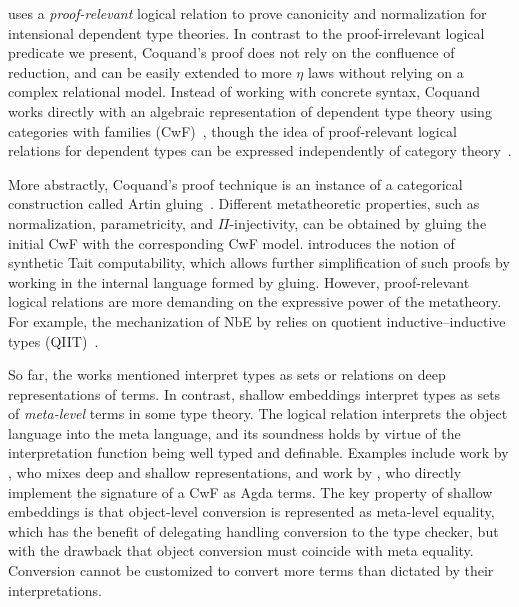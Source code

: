 \documentclass[\ifpublic nolinenum\else\fi,online,OA]{jfp}
\newcommand{\jc}[1]{}
\theoremstyle{definition}
\begin{document}
\citet{coquand:canonicity,coquand:prop} uses a \emph{proof-relevant} logical
relation to prove canonicity and normalization for intensional
dependent type theories. In contrast to the proof-irrelevant logical predicate
we present, Coquand's proof does not rely on the confluence of reduction,
and can be easily extended to more $\eta$ laws without relying on a
complex relational model. Instead of working with concrete syntax,
Coquand works directly with an algebraic representation of dependent
type theory using categories with families (CwF)~\citep{hofmann:cwf},
though the idea of proof-relevant logical relations for dependent
types can be expressed independently of category
theory~\citep{barras2012semantical}.

More abstractly, Coquand's proof technique is an instance of a categorical
construction called Artin gluing~\citep{kaposi:gluing}. Different
metatheoretic properties, such as normalization, parametricity, and
$\Pi$-injectivity, can be obtained by gluing the initial CwF with the
corresponding CwF model. \citet{sterling:tait} introduces the notion of
synthetic Tait computability, which allows further
simplification of such proofs by working in the internal language
formed by gluing.
However, proof-relevant logical relations are more demanding on the
expressive power of the metatheory. For example, the mechanization of
NbE by \citet{altenkirch:normalisation} relies on quotient
inductive--inductive types (QIIT)~\citep{kaposi:qiit}.
\jc{I don't understand how the QIIT model relates to gluing,
or what using QIIT has to do with proof relevance of the logical relation.}

So far, the works mentioned interpret types as sets or relations on deep
representations of terms. In contrast, shallow embeddings interpret types as
sets of \emph{meta-level} terms in some type theory. The logical relation
interprets the object language into the meta language, and its soundness holds
by virtue of the interpretation function being well typed and definable.
Examples include work by \citet{kipling}, who mixes deep and shallow
representations, and work by \citet{shallow}, who directly implement the
signature of a CwF as Agda terms. The key property of shallow embeddings is
that object-level conversion is represented as meta-level equality, which has
the benefit of delegating handling conversion to the type checker, but with the
drawback that object conversion must coincide with meta equality. Conversion
cannot be customized to convert more terms than dictated by their
interpretations.
\end{document}
